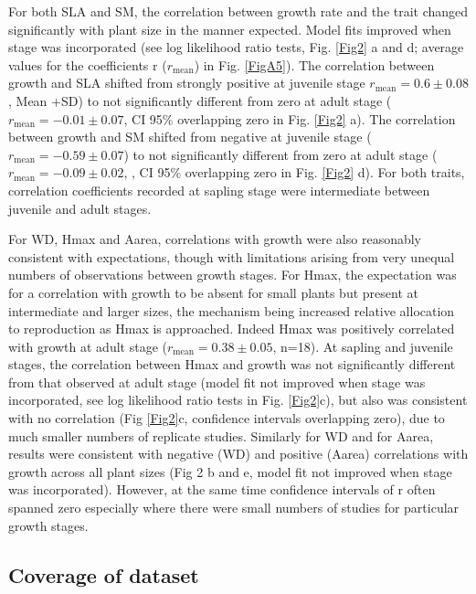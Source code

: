 \documentclass[a4paper]{article}\usepackage[]{graphicx}\usepackage[]{color}
\begin{document}
For both SLA and SM, the correlation between growth rate and the trait  changed significantly with plant size in the manner expected. Model fits improved when stage was incorporated (see log likelihood ratio tests, Fig. \ref{Fig2} a and d; average values for the coefficients r ($r_{\textrm{mean}}$) in Fig. \ref{FigA5}). The correlation between growth and SLA shifted from strongly positive at juvenile stage $r_{\textrm{mean}}=0.6 \pm 0.08$, Mean +SD) to not significantly different from zero at adult stage ($r_{\textrm{mean}}= -0.01 \pm 0.07$, CI 95\% overlapping zero in Fig. \ref{Fig2} a). The correlation between growth and SM shifted from negative at juvenile stage ($r_{\textrm{mean}}= -0.59 \pm 0.07$) to not significantly different from zero at adult stage ($r_{\textrm{mean}}= -0.09 \pm 0.02$, , CI 95\% overlapping zero in Fig. \ref{Fig2} d). For both traits,  correlation coefficients recorded at sapling stage were intermediate between juvenile and adult stages.

For WD, Hmax and Aarea, correlations with growth were also reasonably consistent with expectations, though with limitations arising from very unequal numbers of observations between growth stages. For Hmax, the expectation was for a correlation with growth to be absent for small plants but present at intermediate and larger sizes, the mechanism being increased relative allocation to reproduction as Hmax is approached. Indeed Hmax was positively correlated with growth at adult stage ($r_{\textrm{mean}}= 0.38 \pm 0.05$, n=18). At sapling and juvenile stages, the correlation between Hmax and growth was not significantly different from that observed at adult stage (model fit not improved when stage was incorporated, see log likelihood ratio tests in Fig. \ref{Fig2}c), but also was consistent with no correlation (Fig \ref{Fig2}c, confidence intervals overlapping zero), due to much smaller numbers of replicate studies. Similarly for WD and for Aarea, results were consistent with negative (WD) and positive (Aarea) correlations with growth across all plant sizes (Fig 2 b and e, model fit not improved when stage was incorporated). However, at the same time confidence intervals of r often spanned zero especially where there were small numbers of studies for particular growth stages.

\subsection*{Coverage of dataset}
\end{document}
